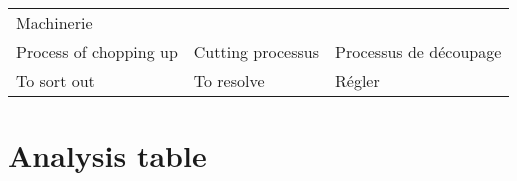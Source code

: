 \documentclass[]{article}
\begin{document}
\begin{longtable}[]{@{}lll@{}}
\begin{minipage}[t]{0.56\columnwidth}
Machinerie\strut
\end{minipage}\tabularnewline
\begin{minipage}[t]{0.18\columnwidth}\raggedright
Process of chopping up\strut
\end{minipage} & \begin{minipage}[t]{0.18\columnwidth}\raggedright
Cutting processus\strut
\end{minipage} & \begin{minipage}[t]{0.56\columnwidth}\raggedright
Processus de découpage\strut
\end{minipage}\tabularnewline
\begin{minipage}[t]{0.18\columnwidth}\raggedright
To sort out\strut
\end{minipage} & \begin{minipage}[t]{0.18\columnwidth}\raggedright
To resolve\strut
\end{minipage} & \begin{minipage}[t]{0.56\columnwidth}\raggedright
Régler\strut
\end{minipage}\tabularnewline
\bottomrule
\end{longtable}

\hypertarget{analysis-table}{%
\section{Analysis table}\label{analysis-table}}
\end{document}
